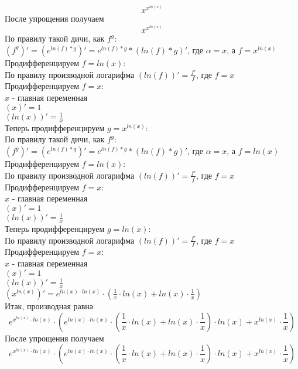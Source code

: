 \documentclass[12pt]{article}
\begin{document}
  $$x^{x^{ln\left(x\right)}}$$
После упрощения получаем
    $$x^{x^{ln\left(x\right)}}$$
По правилу такой дичи, как $f ^ {g}$: $\left(f ^ {g}\right)' = (e ^ {ln\left(f\right) * g})' = e ^ {ln\left(f\right) * g} * \left(ln\left(f\right) * g\right)'$, где $\alpha = x$, а $f = x^{ln\left(x\right)}$\\
Продифференцируем $f = ln\left(x\right)$:\\По правилу производной логарифма $\left(ln\left(f\right)\right)' = \frac{f'}{f}$, где $f = x$\\
Продифференцируем $f = x$:\\$x$ - главная переменная\\$\left(x\right)' = 1$\\$\left(ln\left(x\right)\right)' = \frac{1}{x}$\\
Теперь продифференцируем $g = x^{ln\left(x\right)}$:\\По правилу такой дичи, как $f ^ {g}$: $\left(f ^ {g}\right)' = (e ^ {ln\left(f\right) * g})' = e ^ {ln\left(f\right) * g} * \left(ln\left(f\right) * g\right)'$, где $\alpha = x$, а $f = ln\left(x\right)$\\
Продифференцируем $f = ln\left(x\right)$:\\По правилу производной логарифма $\left(ln\left(f\right)\right)' = \frac{f'}{f}$, где $f = x$\\
Продифференцируем $f = x$:\\$x$ - главная переменная\\$\left(x\right)' = 1$\\$\left(ln\left(x\right)\right)' = \frac{1}{x}$\\
Теперь продифференцируем $g = ln\left(x\right)$:\\По правилу производной логарифма $\left(ln\left(f\right)\right)' = \frac{f'}{f}$, где $f = x$\\
Продифференцируем $f = x$:\\$x$ - главная переменная\\$\left(x\right)' = 1$\\$\left(ln\left(x\right)\right)' = \frac{1}{x}$\\$\left(x^{ln\left(x\right)}\right)' = e^{ln\left(x\right) \cdot ln\left(x\right)} \cdot \left(\frac{1}{x} \cdot ln\left(x\right) + ln\left(x\right) \cdot \frac{1}{x}\right)$\\Итак, производная равна
    $$e^{x^{ln\left(x\right)} \cdot ln\left(x\right)} \cdot \left(e^{ln\left(x\right) \cdot ln\left(x\right)} \cdot \left(\frac{1}{x} \cdot ln\left(x\right) + ln\left(x\right) \cdot \frac{1}{x}\right) \cdot ln\left(x\right) + x^{ln\left(x\right)} \cdot \frac{1}{x}\right)$$
После упрощения получаем
    $$e^{x^{ln\left(x\right)} \cdot ln\left(x\right)} \cdot \left(e^{ln\left(x\right) \cdot ln\left(x\right)} \cdot \left(\frac{1}{x} \cdot ln\left(x\right) + ln\left(x\right) \cdot \frac{1}{x}\right) \cdot ln\left(x\right) + x^{ln\left(x\right)} \cdot \frac{1}{x}\right)$$
\end{document}
